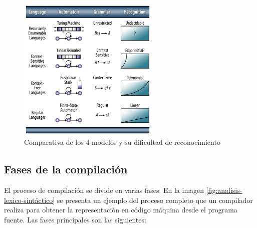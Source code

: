 \begin{figure}[hp!]
    \centering
    \includegraphics[width=0.6\textwidth]{imaxes/c-bases-teoricas/hauser-2016.png}
    \caption{Comparativa de los 4 modelos y su dificultad de reconocimiento \cite{teoriaCompiladores_hauser_automatas}}
    \label{fig:hauser-2016}
\end{figure}

\subsection{Fases de la compilación}

El proceso de compilación se divide en varias fases. En la imagen \ref{fig:analisis-lexico-sintáctico} se presenta un ejemplo del proceso completo que un compilador realiza para obtener la representación en código máquina desde el programa fuente. Las fases principales son las siguientes:

